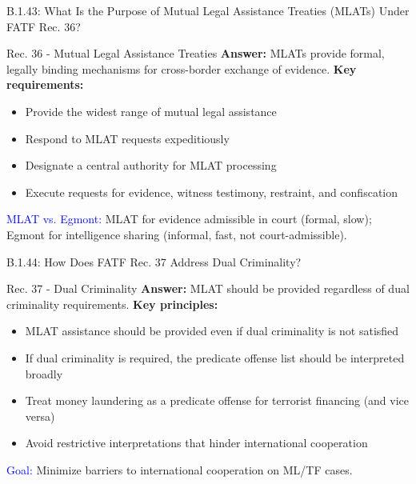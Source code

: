 \documentclass{beamer}
\begin{document}
	\begin{frame}{B.1.43: What Is the Purpose of Mutual Legal Assistance Treaties (MLATs) Under FATF Rec. 36?}
		\begin{block}{Rec. 36 - Mutual Legal Assistance Treaties}
			\textbf{Answer:} MLATs provide formal, legally binding mechanisms for cross-border exchange of evidence.
			\vspace{0.2cm}
			\textbf{Key requirements:}
			\begin{itemize}
				\item Provide the widest range of mutual legal assistance
				\item Respond to MLAT requests expeditiously
				\item Designate a central authority for MLAT processing
				\item Execute requests for evidence, witness testimony, restraint, and confiscation
			\end{itemize}
			\textcolor{blue}{MLAT vs. Egmont:} MLAT for evidence admissible in court (formal, slow); Egmont for intelligence sharing (informal, fast, not court-admissible).
		\end{block}
	\end{frame}
	
	\begin{frame}{B.1.44: How Does FATF Rec. 37 Address Dual Criminality?}
		\begin{block}{Rec. 37 - Dual Criminality}
			\textbf{Answer:} MLAT should be provided regardless of dual criminality requirements.
			\vspace{0.2cm}
			\textbf{Key principles:}
			\begin{itemize}
				\item MLAT assistance should be provided even if dual criminality is not satisfied
				\item If dual criminality is required, the predicate offense list should be interpreted broadly
				\item Treat money laundering as a predicate offense for terrorist financing (and vice versa)
				\item Avoid restrictive interpretations that hinder international cooperation
			\end{itemize}
			\textcolor{blue}{Goal:} Minimize barriers to international cooperation on ML/TF cases.
		\end{block}
	\end{frame}
	
\end{document}
